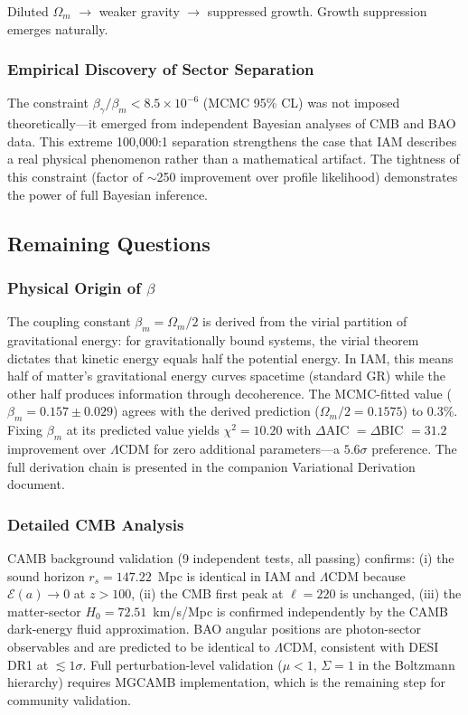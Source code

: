 \documentclass[11pt,letterpaper]{article}
\begin{document}
\noindent Diluted $\Omega_m$ $\rightarrow$ weaker gravity $\rightarrow$ suppressed growth. Growth suppression emerges naturally.

\subsubsection{Empirical Discovery of Sector Separation}

The constraint $\beta_\gamma/\beta_m < 8.5 \times 10^{-6}$ (MCMC 95\% CL) was not imposed theoretically---it emerged from independent Bayesian analyses of CMB and BAO data. This extreme 100,000:1 separation strengthens the case that IAM describes a real physical phenomenon rather than a mathematical artifact. The tightness of this constraint (factor of $\sim$250 improvement over profile likelihood) demonstrates the power of full Bayesian inference.

\subsection{Remaining Questions}

\subsubsection{Physical Origin of $\beta$}

The coupling constant $\beta_m = \Omega_m/2$ is derived from the virial partition of gravitational energy: for gravitationally bound systems, the virial theorem dictates that kinetic energy equals half the potential energy. In IAM, this means half of matter's gravitational energy curves spacetime (standard GR) while the other half produces information through decoherence. The MCMC-fitted value ($\beta_m = 0.157 \pm 0.029$) agrees with the derived prediction ($\Omega_m/2 = 0.1575$) to 0.3\%. Fixing $\beta_m$ at its predicted value yields $\chi^2 = 10.20$ with $\Delta$AIC $= \Delta$BIC $= 31.2$ improvement over $\Lambda$CDM for zero additional parameters---a $5.6\sigma$ preference. The full derivation chain is presented in the companion Variational Derivation document.

\subsubsection{Detailed CMB Analysis}

CAMB background validation (9 independent tests, all passing) confirms: (i) the sound horizon $r_s = 147.22$~Mpc is identical in IAM and $\Lambda$CDM because $\mathcal{E}(a) \to 0$ at $z > 100$, (ii) the CMB first peak at $\ell = 220$ is unchanged, (iii) the matter-sector $H_0 = 72.51$~km/s/Mpc is confirmed independently by the CAMB dark-energy fluid approximation. BAO angular positions are photon-sector observables and are predicted to be identical to $\Lambda$CDM, consistent with DESI DR1 at $\lesssim 1\sigma$. Full perturbation-level validation ($\mu < 1$, $\Sigma = 1$ in the Boltzmann hierarchy) requires MGCAMB implementation, which is the remaining step for community validation.
\end{document}
